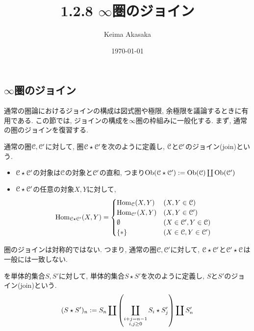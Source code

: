 \documentclass[uplatex, a4paper, 14Q, dvipdfmx]{jsreport}
\title{1.2.8 \texorpdfstring{$\infty$}{infty}圏のジョイン}
\author{Keima Akasaka}
\date{\today}
\begin{document}

\setcounter{chapter}{1}
\setcounter{section}{2} 
\setcounter{subsection}{7}   
\setcounter{subsubsection}{1}

\subsection{\texorpdfstring{$\infty$}{infty}圏のジョイン}

通常の圏論におけるジョインの構成は図式圏や極限, 余極限を議論するときに有用である. 
この節では, ジョインの構成を$\infty$圏の枠組みに一般化する.
まず, 通常の圏のジョインを復習する. 

通常の圏$\mathcal{C},\mathcal{C}'$に対して, 圏$\mathcal{C} \star \mathcal{C}'$を次のように定義し, $\mathcal{C}$と$\mathcal{C}'$のジョイン(join)という.
\begin{itemize}
  \item $\mathcal{C} \star \mathcal{C}'$の対象は$\mathcal{C}$の対象と$\mathcal{C}'$の直和, つまり$\mathrm{Ob}(\mathcal{C} \star \mathcal{C}') := \mathrm{Ob}(\mathcal{C}) \coprod \mathrm{Ob}(\mathcal{C}')$
  \item $\mathcal{C} \star \mathcal{C}'$の任意の対象$X,Y$に対して, 
  \begin{align*}
    \mathrm{Hom}_{\mathcal{C} \star \mathcal{C}'}(X,Y) = 
    \begin{cases}
      \mathrm{Hom}_{\mathcal{C}}(X,Y)    & (X,Y \in \mathcal{C}) \\
      \mathrm{Hom}_{\mathcal{C}'}(X,Y) & (X,Y \in \mathcal{C}') \\
      \emptyset       & (X \in \mathcal{C}', Y \in \mathcal{C}) \\
      \{\ast\}        & (X \in \mathcal{C}, Y \in \mathcal{C}')
    \end{cases}
  \end{align*}
\end{itemize}
圏のジョインは対称的ではない. 
つまり, 通常の圏$\mathcal{C},\mathcal{C}'$に対して, $\mathcal{C} \star \mathcal{C}'$と$\mathcal{C}' \star \mathcal{C}$は一般には一致しない. 

\begin{definition}[単体的集合のジョイン] \label{def.1.2.8.1}
  を単体的集合$S,S'$に対して, 単体的集合$S \star S'$を次のように定義し, $S$と$S'$のジョイン(join)という. 
  \begin{align*}
    (S \star S')_n := S_n \coprod \qty(\coprod_{\substack{i+j=n-1 \\ i,j \geq 0}} S_i \star S'_j) \coprod S'_n
  \end{align*}
\end{definition}
\end{document}
